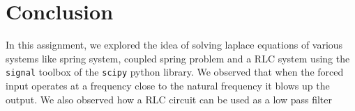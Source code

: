 \documentclass[12pt, a4paper]{report}
\begin{document}
\section*{Conclusion}
In this assignment, we explored the idea of solving laplace equations of various systems like spring system, coupled spring problem and a RLC system using the \texttt{signal} toolbox of the \texttt{scipy} python library. We observed that when the forced input operates at a frequency close to the natural frequency it blows up the output. We also observed how a RLC circuit can be used as a low pass filter
\end{document}
